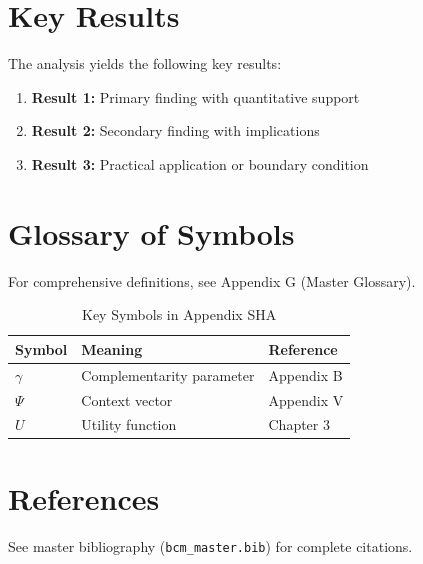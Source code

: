 \section{Key Results}
\label{sec:sha-results}

The analysis yields the following key results:

\begin{enumerate}
    \item \textbf{Result 1:} Primary finding with quantitative support
    \item \textbf{Result 2:} Secondary finding with implications
    \item \textbf{Result 3:} Practical application or boundary condition
\end{enumerate}

\section{Glossary of Symbols}
\label{sec:sha-glossary}

For comprehensive definitions, see Appendix G (Master Glossary).

\begin{table}[htbp]
\centering
\caption{Key Symbols in Appendix SHA}
\begin{tabular}{lll}
\toprule
\textbf{Symbol} & \textbf{Meaning} & \textbf{Reference} \\
\midrule
$\gamma$ & Complementarity parameter & Appendix B \\
$\Psi$ & Context vector & Appendix V \\
$U$ & Utility function & Chapter 3 \\
\bottomrule
\end{tabular}
\end{table}


\section{References}
\label{sec:sha-references}

See master bibliography (\texttt{bcm\_master.bib}) for complete citations.

\nocite{bcm_master}

